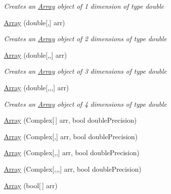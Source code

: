 \begin{DoxyCompactItemize}
\begin{DoxyCompactList}\small\item\em Creates an \mbox{\hyperlink{classkhiva_1_1array_1_1_array}{Array}} object of 1 dimension of type double \end{DoxyCompactList}\item 
\mbox{\hyperlink{classkhiva_1_1array_1_1_array_a1c7e8738b372e1302304407010e7ddb5}{Array}} (double\mbox{[},\mbox{]} arr)
\begin{DoxyCompactList}\small\item\em Creates an \mbox{\hyperlink{classkhiva_1_1array_1_1_array}{Array}} object of 2 dimensions of type double \end{DoxyCompactList}\item 
\mbox{\hyperlink{classkhiva_1_1array_1_1_array_ab9ff6c9b0d6aae4d478b652027f06cc7}{Array}} (double\mbox{[},,\mbox{]} arr)
\begin{DoxyCompactList}\small\item\em Creates an \mbox{\hyperlink{classkhiva_1_1array_1_1_array}{Array}} object of 3 dimensions of type double \end{DoxyCompactList}\item 
\mbox{\hyperlink{classkhiva_1_1array_1_1_array_a0b04615a046c8aacbfbf954c6e978188}{Array}} (double\mbox{[},,,\mbox{]} arr)
\begin{DoxyCompactList}\small\item\em Creates an \mbox{\hyperlink{classkhiva_1_1array_1_1_array}{Array}} object of 4 dimensions of type double \end{DoxyCompactList}\item 
\mbox{\hyperlink{classkhiva_1_1array_1_1_array_a20548767e46ad5aab5a2fb4cb9295250}{Array}} (Complex\mbox{[}$\,$\mbox{]} arr, bool double\+Precision)
\item 
\mbox{\hyperlink{classkhiva_1_1array_1_1_array_a948cabef3c08dd8111e2425fa3ceaaad}{Array}} (Complex\mbox{[},\mbox{]} arr, bool double\+Precision)
\item 
\mbox{\hyperlink{classkhiva_1_1array_1_1_array_aeadaf6a13e5d5d2e1fd1cf10697b6661}{Array}} (Complex\mbox{[},,\mbox{]} arr, bool double\+Precision)
\item 
\mbox{\hyperlink{classkhiva_1_1array_1_1_array_a98bf389ff3930879b1c0c62cf55612d2}{Array}} (Complex\mbox{[},,,\mbox{]} arr, bool double\+Precision)
\item 
\mbox{\hyperlink{classkhiva_1_1array_1_1_array_a78f5d47ca205ba9c4f6ef789db4ca172}{Array}} (bool\mbox{[}$\,$\mbox{]} arr)
\item 

\end{DoxyCompactItemize}
